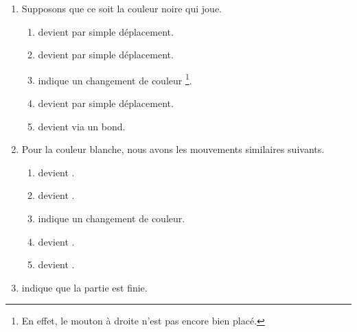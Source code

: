 \begin{enumerate}
	\item Supposons que ce soit la couleur noire qui joue.
	\begin{enumerate}
		\item \boxedB\boxit{$\times$}\emptybox{}
		      devient
		      \boxit{$\times$}\wboxedB\emptybox{}
		      par simple déplacement.


		\item \boxedB\boxit{$\times$}\wboxedB{}
		      devient
	    	  \boxit{$\times$}\wboxedB\wboxedB{}
		      par simple déplacement.


		\item \boxedB\boxit{$\times$}\boxedB{} indique un changement de couleur 
		      \footnote{
		      		En effet, le mouton à droite n'est pas encore bien placé.
			  }.


		\item \boxedB\boxit{$\times$}\boxedW{}
		      devient
		      \boxit{$\times$}\boxedB\boxedW{}
		      par simple déplacement.


		\item \boxedB\boxedW\boxit{$\times$}{}
		      devient
	    	  \boxit{$\times$}\boxedW\boxedB{}
		      via un bond.
	\end{enumerate}
	
	
	\item Pour la couleur blanche, nous avons les mouvements similaires suivants.
	\begin{enumerate}
		\item \emptybox\boxit{$\times$}\boxedW{}
		      devient
		      \emptybox\wboxedW\boxit{$\times$} .


		\item \wboxedW\boxit{$\times$}\boxedW{}
		      devient
	    	  \wboxedW\wboxedW\boxit{$\times$} .


		\item \boxedW\boxit{$\times$}\boxedW{} indique un changement de couleur.


		\item \boxedB\boxit{$\times$}\boxedW{}
		      devient
		      \boxedB\boxedW\boxit{$\times$} .


		\item \boxit{$\times$}\boxedB\boxedW{}
		      devient
	    	  \boxedW\boxedB\boxit{$\times$} .
	\end{enumerate}
	
	
	\item \wboxedW\boxit{$\times$}\wboxedB{} indique que la partie est finie.
\end{enumerate}


